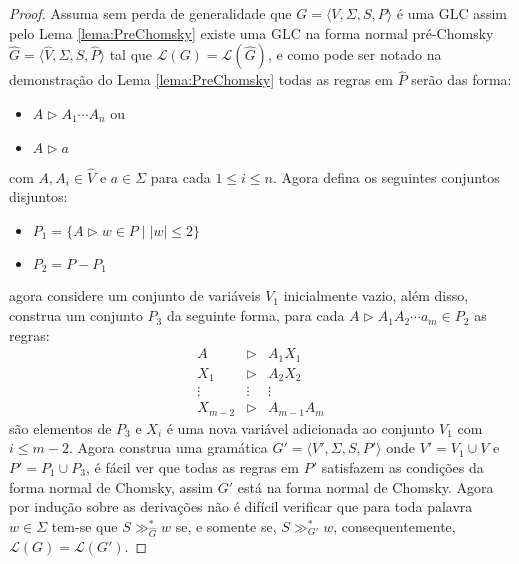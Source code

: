 \begin{proof}
    Assuma sem perda de generalidade que $G = \langle V, \Sigma, S, P \rangle$ é uma GLC assim pelo Lema \ref{lema:PreChomsky} existe uma GLC na forma normal pré-Chomsky $\widehat{G} = \langle \widehat{V}, \Sigma, S, \widehat{P} \rangle$ tal que $\mathcal{L}(G) = \mathcal{L}(\widehat{G})$, e como pode ser notado na demonstração do  Lema \ref{lema:PreChomsky} todas as regras em $\widehat{P}$ serão das forma:
    \begin{itemize}
        \item $A \rhd A_1 \cdots A_n$ ou 
        \item $A \rhd a$
    \end{itemize}
    com $A, A_i \in \widehat{V}$ e $a \in \Sigma$ para cada $1 \leq i \leq n$. Agora defina os seguintes conjuntos disjuntos:
    \begin{itemize}
        \item $P_{1} = \{A \rhd w \in P \mid |w| \leq 2\}$
        \item $P_{2} = P - P_{1}$
    \end{itemize}
    agora considere um conjunto de variáveis $V_1$ inicialmente vazio, além disso,  construa um conjunto $P_3$ da seguinte forma, para cada $A \rhd A_1A_2\cdots a_m \in P_2$ as regras:
    \begin{eqnarray*}
        A & \rhd & A_1X_1\\
        X_1 & \rhd & A_2X_2\\
        \vdots & \vdots & \vdots\\
        X_{m-2} & \rhd & A_{m-1}A_{m}
    \end{eqnarray*}
    são elementos de $P_3$ e $X_i$ é uma nova variável adicionada ao conjunto $V_1$ com $i \leq m-2$. Agora construa uma gramática $G' = \langle V', \Sigma, S, P' \rangle$ onde $V' = V_1 \cup V$ e $P' = P_1 \cup P_3$, é fácil ver que todas as regras em $P'$ satisfazem as condições da forma normal de Chomsky, assim $G'$ está na forma normal de Chomsky. Agora por indução sobre as derivações não é difícil verificar que para toda palavra $w \in \Sigma$ tem-se que $S \gg^*_{\widehat{G}} w$ se, e somente se, $S \gg^*_{G'} w$,  consequentemente,  $\mathcal{L}(G) = \mathcal{L}(G')$.
\end{proof}